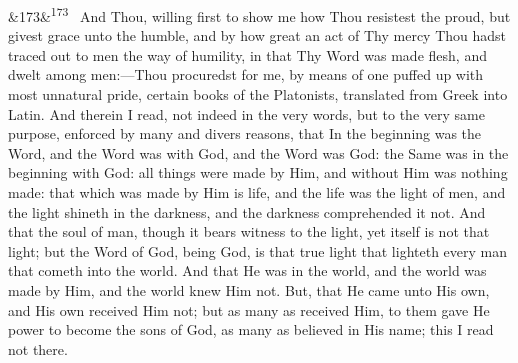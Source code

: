 \documentclass[12pt]{article}
\newcommand{\para}[1][]{\par\noindent\ifx&#1&\else\textsuperscript{\footnotesize #1}~\fi}
\begin{document}
\para[173] And Thou, willing first to show me how Thou resistest the proud, but givest grace unto the humble, and by how great an act of Thy mercy Thou hadst traced out to men the way of humility, in that Thy Word was made flesh, and dwelt among men:---Thou procuredst for me, by means of one puffed up with most unnatural pride, certain books of the Platonists, translated from Greek into Latin. And therein I read, not indeed in the very words, but to the very same purpose, enforced by many and divers reasons, that In the beginning was the Word, and the Word was with God, and the Word was God: the Same was in the beginning with God: all things were made by Him, and without Him was nothing made: that which was made by Him is life, and the life was the light of men, and the light shineth in the darkness, and the darkness comprehended it not. And that the soul of man, though it bears witness to the light, yet itself is not that light; but the Word of God, being God, is that true light that lighteth every man that cometh into the world. And that He was in the world, and the world was made by Him, and the world knew Him not. But, that He came unto His own, and His own received Him not; but as many as received Him, to them gave He power to become the sons of God, as many as believed in His name; this I read not there.
\end{document}
